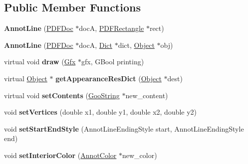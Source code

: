 \subsection*{Public Member Functions}
\begin{DoxyCompactItemize}
\item 
\mbox{\label{class_annot_line_ad8debace93747921baa88fc3b376fa7e}} 
{\bfseries Annot\+Line} (\hyperlink{class_p_d_f_doc}{P\+D\+F\+Doc} $\ast$docA, \hyperlink{class_p_d_f_rectangle}{P\+D\+F\+Rectangle} $\ast$rect)
\item 
\mbox{\label{class_annot_line_a49970e1ee39a429161a7f923a4012c3b}} 
{\bfseries Annot\+Line} (\hyperlink{class_p_d_f_doc}{P\+D\+F\+Doc} $\ast$docA, \hyperlink{class_dict}{Dict} $\ast$dict, \hyperlink{class_object}{Object} $\ast$obj)
\item 
\mbox{\label{class_annot_line_ae22b4b61ffafa133f5440762e2d06e58}} 
virtual void {\bfseries draw} (\hyperlink{class_gfx}{Gfx} $\ast$gfx, G\+Bool printing)
\item 
\mbox{\label{class_annot_line_ae8729490393174b9dc93e266777dc550}} 
virtual \hyperlink{class_object}{Object} $\ast$ {\bfseries get\+Appearance\+Res\+Dict} (\hyperlink{class_object}{Object} $\ast$dest)
\item 
\mbox{\label{class_annot_line_a27245d70f4397e3df0bac66ef927e0d0}} 
virtual void {\bfseries set\+Contents} (\hyperlink{class_goo_string}{Goo\+String} $\ast$new\+\_\+content)
\item 
\mbox{\label{class_annot_line_a3e99e171e525512f282496fd2febb79c}} 
void {\bfseries set\+Vertices} (double x1, double y1, double x2, double y2)
\item 
\mbox{\label{class_annot_line_a600a78be1c1c857f2c4d828420267748}} 
void {\bfseries set\+Start\+End\+Style} (Annot\+Line\+Ending\+Style start, Annot\+Line\+Ending\+Style end)
\item 
\mbox{\label{class_annot_line_a6805ea2b6ba666eb695ae653ec8a9fb0}} 
void {\bfseries set\+Interior\+Color} (\hyperlink{class_annot_color}{Annot\+Color} $\ast$new\+\_\+color)

\end{DoxyCompactItemize}
